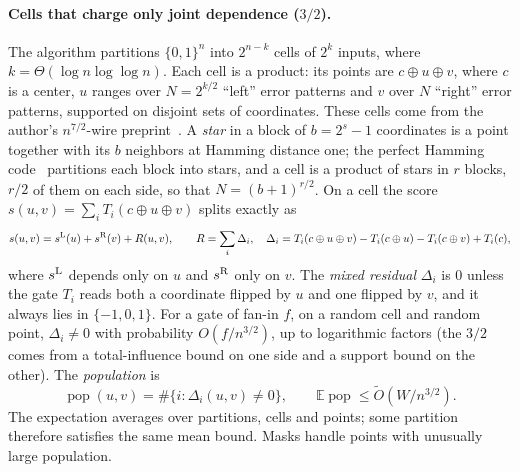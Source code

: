 \documentclass[11pt,letterpaper]{article}
\theoremstyle{definition}
\theoremstyle{remark}
\newcommand{\E}{\mathbb E}
\newcommand{\pop}{\operatorname{pop}}
\begin{document}
\paragraph{Cells that charge only joint dependence ($3/2$).}
The algorithm partitions \(\{0,1\}^n\) into \(2^{n-k}\) cells of
\(2^k\) inputs, where \(k=\Theta(\log n\log\log n)\). Each cell is a
product: its points are \(c\oplus u\oplus v\), where \(c\) is a center,
\(u\) ranges over \(N=2^{k/2}\) ``left'' error patterns and \(v\) over
\(N\) ``right'' error patterns, supported on disjoint sets of
coordinates. These cells come from the author's \(n^{7/2}\)-wire
preprint~\cite[Appendix~A]{Nag72}. A \emph{star} in a block of \(b=2^s-1\)
coordinates is a point together with its \(b\) neighbors at Hamming
distance one; the perfect Hamming code~\cite{Hamming} partitions each block into
stars, and a cell is a product of stars in \(r\) blocks, \(r/2\) of
them on each side, so that \(N=(b+1)^{r/2}\). On a cell the score
\(s(u,v)=\sum_iT_i(c\oplus u\oplus v)\) splits exactly as
\[
 s(u,v)=s^{\rm L}(u)+s^{\rm R}(v)+R(u,v),\qquad
 R=\sum_i\Delta_i,\quad
 \Delta_i=T_i(c\oplus u\oplus v)-T_i(c\oplus u)-T_i(c\oplus v)+T_i(c),
\]
where \(s^{\rm L}\) depends only on \(u\) and \(s^{\rm R}\) only on
\(v\). The \emph{mixed residual} \(\Delta_i\) is \(0\) unless the gate
\(T_i\) reads both a coordinate flipped by \(u\) and one flipped by
\(v\), and it always lies in \(\{-1,0,1\}\). For a gate of fan-in
\(f\), on a random cell and random point, \(\Delta_i\ne0\) with
probability \(O(f/n^{3/2})\), up to logarithmic factors (the
\(3/2\) comes from a total-influence bound on one side and a support
bound on the other). The \emph{population} is
\[
 \pop(u,v)=\#\{i:\Delta_i(u,v)\ne0\},\qquad
 \E\pop\le\widetilde O(W/n^{3/2}).
\]
The expectation averages over partitions, cells and points; some
partition therefore satisfies the same mean bound. Masks handle
points with unusually large population.


\end{document}
